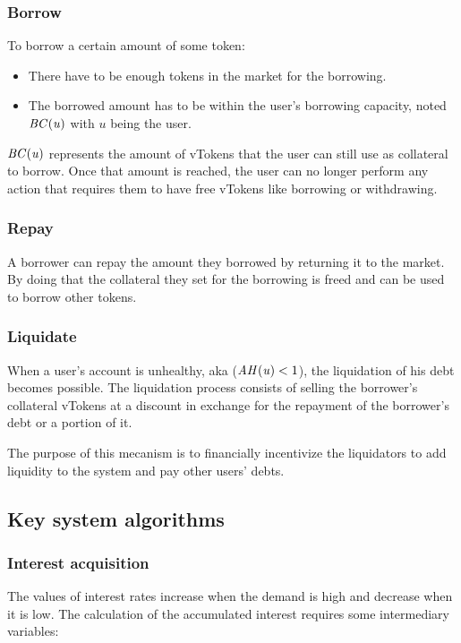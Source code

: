 \subsubsection{Borrow}
To borrow a certain amount of some token:

\begin{itemize}
  \item There have to be enough tokens in the market for the borrowing.
  \item The borrowed amount has to be within the user's borrowing capacity, noted $\mathit{BC(u)}$ with $u$ being the user.
\end{itemize}

$\mathit{BC(u)}$ represents the amount of vTokens that the user can still use as collateral to borrow. Once that amount is reached, the user can no longer perform any action that requires them to have free vTokens like borrowing or withdrawing.

\subsubsection{Repay}

A borrower can repay the amount they borrowed by returning it to the market. By doing that the collateral they set for the borrowing is freed and can be used to borrow other tokens.

\subsubsection{Liquidate}

When a user's account is unhealthy, aka ($\mathit{AH(u)} < 1$), the liquidation of his debt becomes possible. The liquidation process consists of selling the borrower's collateral vTokens at a discount in exchange for the repayment of the borrower's debt or a portion of it.

The purpose of this mecanism is to financially incentivize the liquidators to add liquidity to the system and pay other users' debts.

\subsection{Key system algorithms}

\subsubsection{Interest acquisition}

The values of interest rates increase when the demand is high and decrease when it is low. The calculation of the accumulated interest requires some intermediary variables:

